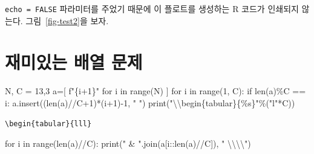 \documentclass[
  chapter,a4paper,showtrims,openright,hidelinks]{oblivoir}
\newenvironment{Shaded}{\begin{snugshade}}{\end{snugshade}}
\newcommand{\BuiltInTok}[1]{\textcolor[rgb]{0.00,0.23,0.31}{#1}}
\newcommand{\CharTok}[1]{\textcolor[rgb]{0.13,0.47,0.30}{#1}}
\newcommand{\ControlFlowTok}[1]{\textcolor[rgb]{0.00,0.23,0.31}{#1}}
\newcommand{\DecValTok}[1]{\textcolor[rgb]{0.68,0.00,0.00}{#1}}
\newcommand{\KeywordTok}[1]{\textcolor[rgb]{0.00,0.23,0.31}{#1}}
\newcommand{\NormalTok}[1]{\textcolor[rgb]{0.00,0.23,0.31}{#1}}
\newcommand{\OperatorTok}[1]{\textcolor[rgb]{0.37,0.37,0.37}{#1}}
\newcommand{\SpecialCharTok}[1]{\textcolor[rgb]{0.37,0.37,0.37}{#1}}
\newcommand{\SpecialStringTok}[1]{\textcolor[rgb]{0.13,0.47,0.30}{#1}}
\newcommand{\StringTok}[1]{\textcolor[rgb]{0.13,0.47,0.30}{#1}}
\begin{document}
\texttt{echo\ =\ FALSE} 파라미터를 주었기 때문에 이 플로트를 생성하는 R
코드가 인쇄되지 않는다. 그림~\ref{fig-test2}을
보자.

\hypertarget{uxc7acuxbbf8uxc788uxb294-uxbc30uxc5f4-uxbb38uxc81c}{%
\section{재미있는 배열
문제}\label{uxc7acuxbbf8uxc788uxb294-uxbc30uxc5f4-uxbb38uxc81c}}

\begin{Shaded}
\begin{Highlighting}[]
\NormalTok{N, C }\OperatorTok{=} \DecValTok{13}\NormalTok{,}\DecValTok{3}
\NormalTok{a}\OperatorTok{=}\NormalTok{[ }\SpecialStringTok{f"}\SpecialCharTok{\{}\NormalTok{i}\OperatorTok{+}\DecValTok{1}\SpecialCharTok{\}}\SpecialStringTok{"} \ControlFlowTok{for}\NormalTok{ i }\KeywordTok{in} \BuiltInTok{range}\NormalTok{(N) ]}
\ControlFlowTok{for}\NormalTok{ i }\KeywordTok{in} \BuiltInTok{range}\NormalTok{(}\DecValTok{1}\NormalTok{, C):}
    \ControlFlowTok{if} \BuiltInTok{len}\NormalTok{(a)}\OperatorTok{\%}\NormalTok{C }\OperatorTok{==}\NormalTok{ i: a.insert((}\BuiltInTok{len}\NormalTok{(a)}\OperatorTok{//}\NormalTok{C}\OperatorTok{+}\DecValTok{1}\NormalTok{)}\OperatorTok{*}\NormalTok{(i}\OperatorTok{+}\DecValTok{1}\NormalTok{)}\OperatorTok{{-}}\DecValTok{1}\NormalTok{, }\StringTok{" "}\NormalTok{)}
\BuiltInTok{print}\NormalTok{(}\StringTok{"}\CharTok{\textbackslash{}\textbackslash{}}\StringTok{begin}\SpecialCharTok{\{tabular\}}\StringTok{\{}\SpecialCharTok{\%s}\StringTok{\}"}\OperatorTok{\%}\NormalTok{(}\StringTok{"l"}\OperatorTok{*}\NormalTok{C))}
\end{Highlighting}
\end{Shaded}

\begin{verbatim}
\begin{tabular}{lll}
\end{verbatim}

\begin{Shaded}
\begin{Highlighting}[]
\ControlFlowTok{for}\NormalTok{ i }\KeywordTok{in} \BuiltInTok{range}\NormalTok{(}\BuiltInTok{len}\NormalTok{(a)}\OperatorTok{//}\NormalTok{C): }\BuiltInTok{print}\NormalTok{(}\StringTok{" \& "}\NormalTok{.join(a[i::}\BuiltInTok{len}\NormalTok{(a)}\OperatorTok{//}\NormalTok{C]), }\StringTok{" }\CharTok{\textbackslash{}\textbackslash{}\textbackslash{}\textbackslash{}}\StringTok{"}\NormalTok{)}
\end{Highlighting}
\end{Shaded}
\end{document}
